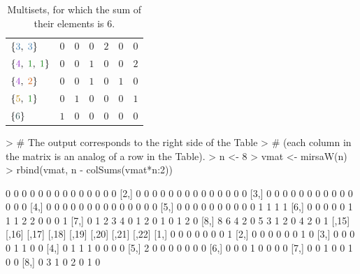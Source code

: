 \documentclass[12pt]{article}
\begin{document}
\begin{table}
\begin{tabular}{|l|ccccc|c|}
  $\{{\color{c3}3}, \; {\color{c3}3}\}$ 
    & \color{c6}$0$ & \color{c5}$0$ & \color{c4}$0$ & \color{c3}$2$ 
    & \color{c2}$0$ & \color{c1}$0$                                           \\
  $\{{\color{c4}4}, \; {\color{c1}1}, \; {\color{c1}1}\}$ 
    & \color{c6}$0$ & \color{c5}$0$ & \color{c4}$1$ & \color{c3}$0$ 
    & \color{c2}$0$ & \color{c1}$2$                                           \\
  $\{{\color{c4}4}, \; {\color{c2}2}\}$ 
    & \color{c6}$0$ & \color{c5}$0$ & \color{c4}$1$ & \color{c3}$0$ 
    & \color{c2}$1$ & \color{c1}$0$                                           \\
  $\{{\color{c5}5}, \; {\color{c1}1}\}$ 
    & \color{c6}$0$ & \color{c5}$1$ & \color{c4}$0$ & \color{c3}$0$ 
    & \color{c2}$0$ & \color{c1}$1$                                           \\
  $\{{\color{c6}6}\}$ 
    & \color{c6}$1$ & \color{c5}$0$ & \color{c4}$0$ & \color{c3}$0$ 
    & \color{c2}$0$ & \color{c1}$0$                                           \\  
  \hline
  \end{tabular}
  \caption{Multisets, for which the sum of their elements is $6$.}
  \label{tab:ex4}
\end{table}  

\begin{Schunk}
\begin{Sinput}
> # The output corresponds to the right side of the Table 
> # (each column in the matrix is an analog of a row in the Table).
> n <- 8
> vmat <- mirsaW(n)
> rbind(vmat, n - colSums(vmat*n:2))
\end{Sinput}
\begin{Soutput}
     [,1] [,2] [,3] [,4] [,5] [,6] [,7] [,8] [,9] [,10] [,11] [,12] [,13] [,14]
[1,]    0    0    0    0    0    0    0    0    0     0     0     0     0     0
[2,]    0    0    0    0    0    0    0    0    0     0     0     0     0     0
[3,]    0    0    0    0    0    0    0    0    0     0     0     0     0     0
[4,]    0    0    0    0    0    0    0    0    0     0     0     0     0     0
[5,]    0    0    0    0    0    0    0    0    0     0     1     1     1     1
[6,]    0    0    0    0    0    1    1    1    2     2     0     0     0     1
[7,]    0    1    2    3    4    0    1    2    0     1     0     1     2     0
[8,]    8    6    4    2    0    5    3    1    2     0     4     2     0     1
     [,15] [,16] [,17] [,18] [,19] [,20] [,21] [,22]
[1,]     0     0     0     0     0     0     0     1
[2,]     0     0     0     0     0     0     1     0
[3,]     0     0     0     0     1     1     0     0
[4,]     0     1     1     1     0     0     0     0
[5,]     2     0     0     0     0     0     0     0
[6,]     0     0     0     1     0     0     0     0
[7,]     0     0     1     0     0     1     0     0
[8,]     0     3     1     0     2     0     1     0
\end{Soutput}
\end{Schunk}
\end{document}
